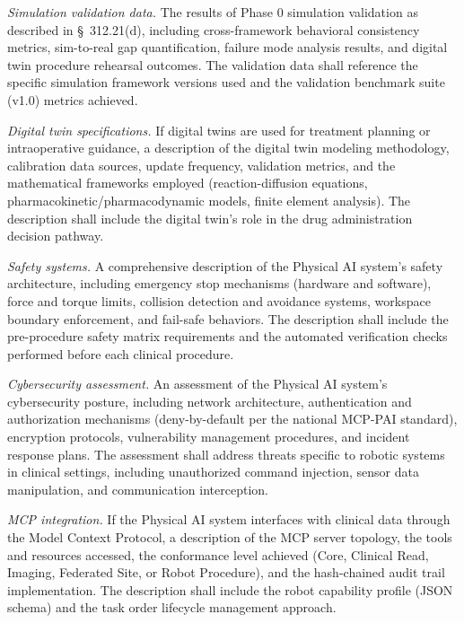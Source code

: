 \begin{description}[leftmargin=0.8cm,style=sameline]
\item[(v)] \textit{Simulation validation data.} The results of Phase 0 simulation validation as described in \S~312.21(d), including cross-framework behavioral consistency metrics, sim-to-real gap quantification, failure mode analysis results, and digital twin procedure rehearsal outcomes. The validation data shall reference the specific simulation framework versions used and the validation benchmark suite (v1.0) metrics achieved.

\item[(vi)] \textit{Digital twin specifications.} If digital twins are used for treatment planning or intraoperative guidance, a description of the digital twin modeling methodology, calibration data sources, update frequency, validation metrics, and the mathematical frameworks employed (reaction-diffusion equations, pharmacokinetic/pharmacodynamic models, finite element analysis). The description shall include the digital twin's role in the drug administration decision pathway.

\item[(vii)] \textit{Safety systems.} A comprehensive description of the Physical AI system's safety architecture, including emergency stop mechanisms (hardware and software), force and torque limits, collision detection and avoidance systems, workspace boundary enforcement, and fail-safe behaviors. The description shall include the pre-procedure safety matrix requirements and the automated verification checks performed before each clinical procedure.

\item[(viii)] \textit{Cybersecurity assessment.} An assessment of the Physical AI system's cybersecurity posture, including network architecture, authentication and authorization mechanisms (deny-by-default per the national MCP-PAI standard), encryption protocols, vulnerability management procedures, and incident response plans. The assessment shall address threats specific to robotic systems in clinical settings, including unauthorized command injection, sensor data manipulation, and communication interception.

\item[(ix)] \textit{MCP integration.} If the Physical AI system interfaces with clinical data through the Model Context Protocol, a description of the MCP server topology, the tools and resources accessed, the conformance level achieved (Core, Clinical Read, Imaging, Federated Site, or Robot Procedure), and the hash-chained audit trail implementation. The description shall include the robot capability profile (JSON schema) and the task order lifecycle management approach.


\end{description}
